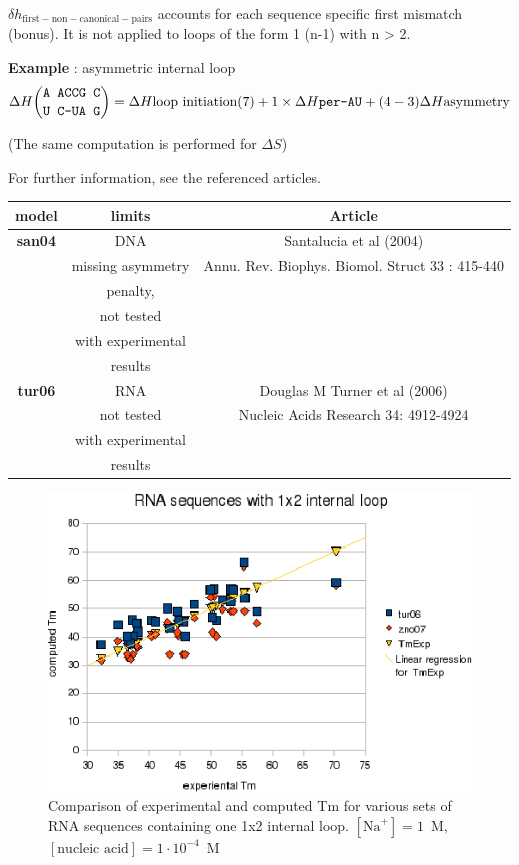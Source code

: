 \documentclass{article}
\begin{document}
$\delta{}h_\mathrm{first-non-canonical-pairs}$ accounts for each sequence
specific first mismatch (bonus). It is not applied to loops of the form 1 \times (n-1) with
n > 2.


\textbf{Example} : asymmetric internal loop
\begin{multline*}
\Delta H {\mbox{\texttt{A ACCG C}} \choose \mbox{\texttt{U C-UA G}}} = 
\Delta H {\mbox{loop initiation(7)}} +
1 \times \Delta H {\mbox{\texttt{per-AU}}} +
(4 - 3)\Delta H {\mbox{asymmetry}}\\
\end{multline*}

       (The same computation is performed for $\Delta S$)    
       
For further information, see the referenced articles.

\begin{table}[hc]
\begin{tabular}[h]{| c | c | c |}
\textbf{model} & \textbf{limits} & \textbf{Article} \\
\hline
\textbf{san04} & DNA & Santalucia et al (2004) \\
 & missing asymmetry & Annu. Rev. Biophys. Biomol. Struct 33 : 415-440\\
 & penalty, & \\
 & not tested & \\
 & with experimental & \\
 & results & \\
 \hline
\textbf{tur06} & RNA & Douglas M Turner et al (2006) \\
 & not tested & Nucleic Acids Research 34: 4912-4924 \\
 & with experimental & \\
 & results & \\
 \hline
\end{tabular}
\end{table}

\begin{figure}[h]
\includegraphics[width=1\linewidth]{images/1x2InternalLoop}
\caption{Comparison of experimental and computed Tm for various sets of
 RNA sequences containing one 1x2 internal loop. $[\mbox{Na}^+] = 1$~M, $[\mbox{nucleic acid}] = 1\cdot{}10^{-4}$~M}
\end{figure}
\end{document}
